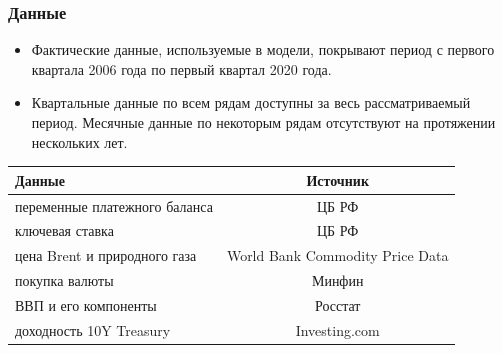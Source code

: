\documentclass[9pt]{beamer}
\begin{document}
\begin{frame}
	\frametitle{Данные}
	\begin{itemize}
		\item Фактические данные, используемые в модели, покрывают период с первого
		квартала 2006 года по первый квартал 2020 года.
		
		\item Квартальные данные по всем рядам доступны за весь рассматриваемый период.
		Месячные данные по некоторым рядам отсутствуют на протяжении нескольких лет.
		
		
	\end{itemize}	
	\begin{center}
		\small
		\begin{tabular}{ l | c }
			\toprule
			Данные  &  Источник  \\
			\midrule
			переменные платежного баланса & ЦБ РФ \\ 
			\midrule
			ключевая ставка & ЦБ РФ \\
			\midrule
			цена Brent и природного газа & World Bank Commodity Price Data \\
			\midrule	
			покупка валюты & Минфин\\
			\midrule
			ВВП и его компоненты & Росстат\\
			\midrule
			доходность 10Y Treasury & Investing.com\\
			\bottomrule			
		\end{tabular}
		\label{tab:7} 
		\normalsize
	\end{center}
	
\end{frame}
\end{document}
